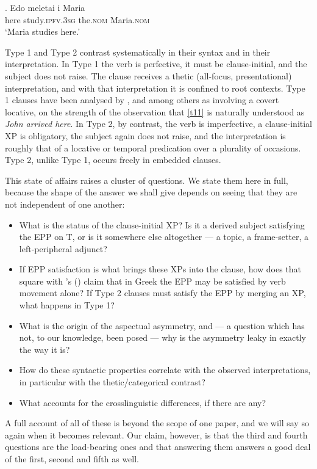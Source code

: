 \documentclass[11pt]{article}
\newcommand{\citeposs}[1]{\citeauthor{#1}'s (\citeyear{#1})}
\newcommand{\typa}{{Type 1}\xspace}
\newcommand{\typb}{{Type 2}\xspace}
\newcommand{\ipfv}{\textsc{ipfv}\xspace}
\begin{document}
\exg. Edo meletai i Maria\\
here study.\ipfv.3\textsc{sg} the.\textsc{nom} Maria.\textsc{nom}\\ \label{t21}
`Maria studies here.'

\typa and \typb contrast systematically in their syntax and in their interpretation.  In \typa the verb is perfective, it must be clause-initial, and the subject does not raise.  The clause receives a thetic (all-focus, presentational) interpretation, and with that interpretation it is confined to root contexts.  \typa clauses have been analysed by \citet{pinto:97}, \citet{alexiadou:11b} and \citet{sheehan:06} among others as involving a covert locative, on the strength of the observation that \ref{t11} is naturally understood as \emph{John arrived here}.  In \typb, by contrast, the verb is imperfective, a clause-initial XP is obligatory, the subject again does not raise, and the interpretation is roughly that of a locative or temporal predication over a plurality of occasions.  \typb, unlike \typa, occurs freely in embedded clauses.

This state of affairs raises a cluster of questions.  We state them here in full, because the shape of the answer we shall give depends on seeing that they are not independent of one another:

\begin{itemize}
\item What is the status of the clause-initial XP?  Is it a derived subject satisfying the EPP on T, or is it somewhere else altogether --- a topic, a frame-setter, a left-peripheral adjunct?
\item If EPP satisfaction is what brings these XPs into the clause, how does that square with \citeposs{alexiadou-anagnostopoulou:98} claim that in Greek the EPP may be satisfied by verb movement alone?  If \typb clauses must satisfy the EPP by merging an XP, what happens in \typa?
\item What is the origin of the aspectual asymmetry, and --- a question which has not, to our knowledge, been posed --- why is the asymmetry leaky in exactly the way it is?
\item How do these syntactic properties correlate with the observed interpretations, in particular with the thetic/categorical contrast?
\item What accounts for the crosslinguistic differences, if there are any?
\end{itemize}

A full account of all of these is beyond the scope of one paper, and we will say so again when it becomes relevant.  Our claim, however, is that the third and fourth questions are the load-bearing ones and that answering them answers a good deal of the first, second and fifth as well.
\end{document}
